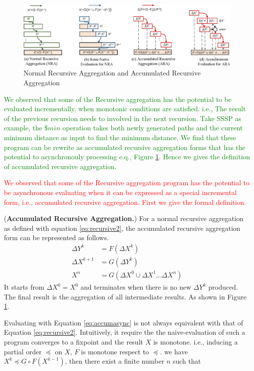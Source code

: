 {
	\begin{figure}[t]
		\vspace{-0.1in}
		\centerline{\includegraphics[width=7in]{fig/accumulative.eps}}
		\caption{Normal Recursive Aggregation and Accumulated Recursive Aggregation }
		\vspace{-0.1in}
		\label{fig:arasssp}
	\end{figure}
	\textcolor{green}{
		We observed that some of the Recursive aggregation has the potential to be evaluated incrementally, when monotonic conditions are satisfied. i.e., The result of the previous recursion needs to involved in the next recursion. Take SSSP as example, the $\$min$ operation takes both newly generated paths and the current minimum distance as input to find the minimum distance. We find that these program can be rewrite as accumulated recursive aggregation forms that has the potential to asynchronouly processing e.q., Figure \ref{fig:arasssp}. Hence we gives the definition of accumulated recursive aggregation.
	}
	
	\textcolor{red}{
		We observed that some of the Recursive aggregation program has the potential to be asynchronous evaluating when it can be expressed as a special incremental form, i.e., accumulated recursive aggregation. First we give the formal definition.
	}
	
	\begin{definition}
		\label{def:araggre}
		(\textbf{Accumulated Recursive Aggregation.})
		For a normal recursive aggregation as defined with equation \ref{eq:recursive2}, the accumulated recursive aggregation form can be represented as follows.
		\begin{equation}\label{eq:accumasync}
		\begin{aligned}
		\Delta Y^{k}&= F(\Delta X^k)\\
		\Delta X^{k+1}&= G(\Delta Y^{k})\\ 
		X^{n}&=G(\Delta X^0\cup\Delta X^1\ldots\Delta X^{n})
		\end{aligned}
		\end{equation}
		It starts from $\Delta X^0=X^0$ and terminates when there is no new $\Delta Y^k$ produced. The final result is the aggregation of all intermediate results. As shown in Figure \ref{fig:arasssp}.
	\end{definition}
{\color{red}
Evaluating with Equation \ref{eq:accumasync} is not always equivalent with that of Equation \ref{eq:recursive2}. Intuitively, it require the the naive-evaluation of such a program converges to a fixpoint and the result $X$ is monotone. i.e., inducing a partial order $\preceq$  on $X$, $F$ is monotone respect to $\preceq$. we have $X^k\preceq G\circ F(X^{k-1})$, then there exist a finite number $n$ such that

}}
